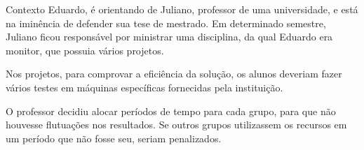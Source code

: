 \documentclass[dvipdfm]{beamer}
\begin{document}


\begin{frame}{Contexto}
	\hspace{1pc}Eduardo, é orientando de Juliano, professor de uma universidade, e está na iminência de defender sua tese de mestrado.
	Em determinado semestre, Juliano ficou responsável por ministrar uma disciplina, da qual Eduardo era monitor, que possuia vários projetos.
	
	\hspace{1pc}Nos projetos, para comprovar a eficiência da solução, os alunos deveriam fazer vários testes em máquinas específicas fornecidas pela instituição.
	
	\hspace{1pc}O professor decidiu alocar períodos de tempo para cada grupo, para que não houvesse flutuações nos resultados.
	Se outros grupos utilizassem os recursos em um período que não fosse seu, seriam penalizados.
\end{frame}
\end{document}

